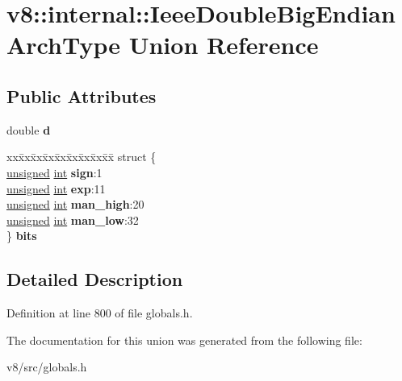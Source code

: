 \hypertarget{unionv8_1_1internal_1_1IeeeDoubleBigEndianArchType}{}\section{v8\+:\+:internal\+:\+:Ieee\+Double\+Big\+Endian\+Arch\+Type Union Reference}
\label{unionv8_1_1internal_1_1IeeeDoubleBigEndianArchType}
\subsection*{Public Attributes}
\begin{DoxyCompactItemize}
\item 
\mbox{\label{unionv8_1_1internal_1_1IeeeDoubleBigEndianArchType_a08d5c0c44b46ddb10508790724f0f6a3}} 
double {\bfseries d}
\item 
\mbox{\label{unionv8_1_1internal_1_1IeeeDoubleBigEndianArchType_ad9d12496522cde196b4a37a9b28b8830}} 
\begin{tabbing}
xx\=xx\=xx\=xx\=xx\=xx\=xx\=xx\=xx\=\kill
struct \{\\
\>\mbox{\hyperlink{classunsigned}{unsigned}} \mbox{\hyperlink{classint}{int}} {\bfseries sign}:1\\
\>\mbox{\hyperlink{classunsigned}{unsigned}} \mbox{\hyperlink{classint}{int}} {\bfseries exp}:11\\
\>\mbox{\hyperlink{classunsigned}{unsigned}} \mbox{\hyperlink{classint}{int}} {\bfseries man\_high}:20\\
\>\mbox{\hyperlink{classunsigned}{unsigned}} \mbox{\hyperlink{classint}{int}} {\bfseries man\_low}:32\\
\} {\bfseries bits}\\

\end{tabbing}\end{DoxyCompactItemize}


\subsection{Detailed Description}


Definition at line 800 of file globals.\+h.



The documentation for this union was generated from the following file\+:\begin{DoxyCompactItemize}
\item 
v8/src/globals.\+h\end{DoxyCompactItemize}

